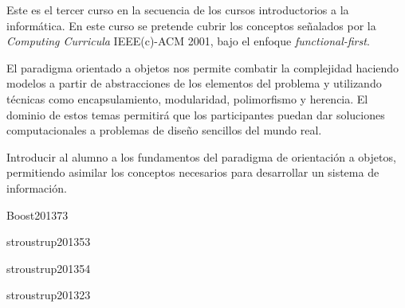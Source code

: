 \begin{syllabus}


\begin{justification}
Este es el tercer curso en la secuencia de los cursos introductorios a la informática. En este curso se pretende cubrir los conceptos señalados por la \textit{Computing Curricula} IEEE(c)-ACM 2001, bajo el enfoque \textit{functional-first}. 

El paradigma orientado a objetos nos permite combatir la
complejidad haciendo modelos a partir de abstracciones de los elementos del problema y utilizando técnicas como encapsulamiento,
modularidad, polimorfismo y herencia. El dominio de estos temas permitirá que los participantes puedan dar soluciones computacionales a problemas de diseño sencillos del mundo real.
\end{justification}

\begin{goals}
\item Introducir al alumno a los fundamentos del paradigma de orientación a objetos, permitiendo asimilar los conceptos necesarios para desarrollar un sistema de información.
\end{goals}

\begin{outcomes}
\end{outcomes}

\begin{unit}{\DSGraphsAndTreesDef}{Boost2013}{7}{3}
    \DSGraphsAndTreesAllTopics
    \DSGraphsAndTreesAllObjectives
\end{unit}

\begin{unit}{\PFFundamentalConstructsDef}{stroustrup2013}{5}{3}
    \PFFundamentalConstructsAllTopics
    \PFFundamentalConstructsAllObjectives
\end{unit}

\begin{unit}{\PFAlgorithmsAndProblemSolvingDef}{stroustrup2013}{5}{4}
    \PFAlgorithmsAndProblemSolvingAllTopics
    \PFAlgorithmsAndProblemSolvingAllObjectives
\end{unit}

\begin{unit}{\PFEventDrivenProgrammingDef}{stroustrup2013}{2}{3}
   \PFEventDrivenProgrammingAllTopics
   \PFEventDrivenProgrammingAllObjectives
\end{unit}


\end{syllabus}
